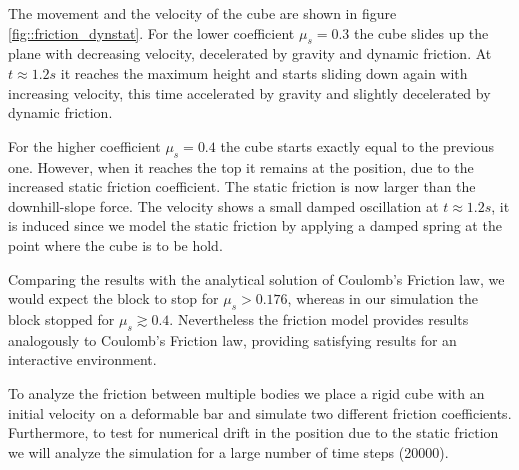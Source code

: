 The movement and the velocity of the cube are shown in figure \ref{fig::friction_dynstat}.
For the lower coefficient $\mu_s=0.3$ the cube slides up the plane with decreasing velocity, decelerated by gravity and dynamic friction.
At $t\approx 1.2s$ it reaches the maximum height and starts sliding down again with increasing velocity, this time accelerated by gravity and slightly decelerated by dynamic friction.

For the higher coefficient $\mu_s=0.4$ the cube starts exactly equal to the previous one. However, when it reaches the top it remains at the position, due to the increased static friction coefficient. The static friction is now larger than the	downhill-slope force. The velocity shows a small damped oscillation at $t\approx 1.2s$, it is induced since we model the static friction by applying a damped spring at the point where the cube is to be hold.

Comparing the results with the analytical solution of Coulomb's Friction law, we would expect the block to stop for $\mu_s>0.176$, whereas in our simulation the block stopped for $\mu_s \gtrsim 0.4$. Nevertheless the friction model provides  results analogously to Coulomb's Friction law, providing satisfying results for an interactive environment.

To analyze the friction between multiple bodies we place a rigid cube with an initial velocity on a deformable bar and simulate two different friction coefficients. Furthermore, to test for numerical drift in the position due to the static friction we will analyze the simulation for a large number of time steps (20000).

